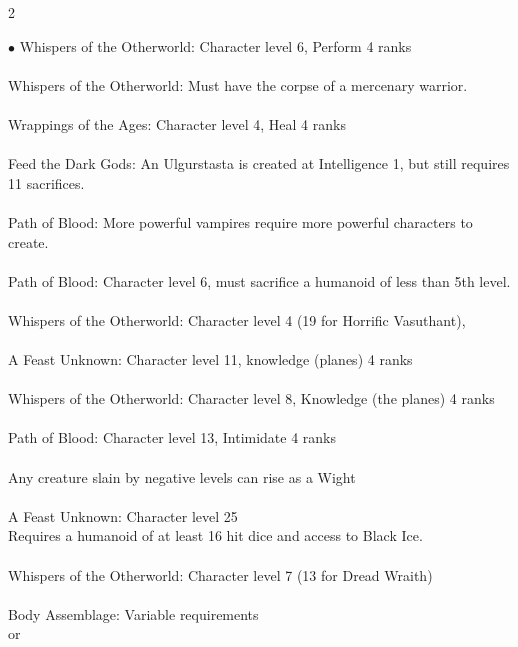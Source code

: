\begin{multicols}{2}
\begin{small}
\begin{list}{$\bullet$}{\itemspace}
Whispers of the Otherworld: Character level 6, Perform 4 ranks\\
\\
Whispers of the Otherworld: Must have the corpse of a mercenary warrior.\\
\\
Wrappings of the Ages: Character level 4, Heal 4 ranks\\
\\
Feed the Dark Gods: An Ulgurstasta is created at Intelligence 1, but still requires 11 sacrifices.\\
\\
Path of Blood: More powerful vampires require more powerful characters to create.\\
\\
Path of Blood: Character level 6, must sacrifice a humanoid of less than 5th level.\\
\\
Whispers of the Otherworld: Character level 4 (19 for Horrific Vasuthant), \\
\\
A Feast Unknown: Character level 11, knowledge (planes) 4 ranks\\
\\
Whispers of the Otherworld: Character level 8, Knowledge (the planes) 4 ranks\\
\\
Path of Blood: Character level 13, Intimidate 4 ranks\\
\\
Any creature slain by negative levels can rise as a Wight\\
\\
A Feast Unknown: Character level 25\\
Requires a humanoid of at least 16 hit dice and access to Black Ice.\\
\\
Whispers of the Otherworld: Character level 7 (13 for Dread Wraith)\\
\\
Body Assemblage: Variable requirements\\
or \\

\end{list}
\end{small}
\end{multicols}
